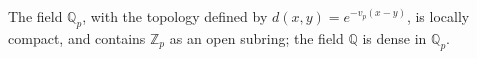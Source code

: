 The field $\mathbb{Q}_p$, with the topology defined by $d(x, y) = e^{-v_p(x-y)}$, is locally compact, and contains $\mathbb{Z}_p$ as an open subring; the field $\mathbb{Q}$ is dense in $\mathbb{Q}_p$.
